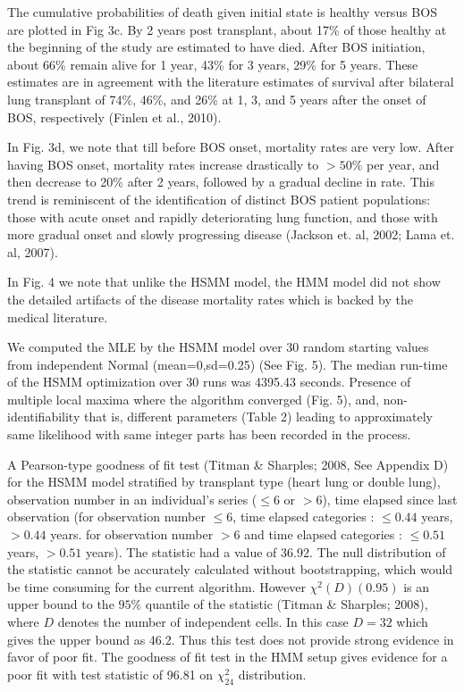 \documentclass{uwstat572}
\begin{document}
The cumulative probabilities of death given initial state is healthy versus BOS are plotted in Fig 3c. By 2 years post transplant, about 17\% of those healthy at the beginning of the study are estimated to have died. After BOS initiation, about 66\% remain alive for 1 year, 43\% for 3 years, 29\% for 5 years. These estimates are in agreement with the literature estimates of survival after bilateral lung transplant of 74\%, 46\%, and 26\% at 1, 3, and 5 years after the onset of BOS, respectively (Finlen et al., 2010).

In Fig. 3d, we note that till before BOS onset, mortality rates are very low. After having BOS onset, mortality rates increase drastically to $>50\%$ per year, and then decrease to 20\% after 2 years, followed by a gradual decline in rate. This trend is reminiscent of the identification of distinct BOS patient populations: those with acute onset and rapidly deteriorating lung function, and those with more gradual onset and slowly progressing disease (Jackson et. al, 2002; Lama et. al, 2007).


In Fig. 4 we note that unlike the HSMM model, the HMM model did not show the detailed artifacts of the disease mortality rates which is backed by the medical literature.

We computed the MLE by the HSMM model over 30 random starting values from independent Normal (mean=0,sd=0.25) (See Fig. 5). The median run-time of the HSMM optimization over 30 runs was 4395.43 seconds. Presence of multiple local maxima where the algorithm converged (Fig. 5), and, non-identifiability that is, different parameters (Table 2) leading to approximately same likelihood with same integer parts has been recorded in the process.



A Pearson-type goodness of fit test (Titman \& Sharples; 2008, See Appendix D) for the HSMM  model stratified by transplant type (heart lung or double lung), observation number in an individual’s series ($\leq 6$ or $>6$), time elapsed since last observation (for observation number $\leq 6$, time elapsed categories : $\leq 0.44$ years, $> 0.44$ years. for observation number $> 6$ and time elapsed categories : $\leq 0.51$ years, $> 0.51$ years). The statistic had a value of 36.92. The null distribution of the statistic cannot be accurately calculated without bootstrapping, which would be time consuming for the current algorithm. However $\chi^2(D) (0.95)$ is an upper bound to the $95\%$ quantile of the statistic (Titman \& Sharples; 2008), where $D$ denotes the number of independent cells. In this case $D = 32$ which gives the upper bound as 46.2. Thus this test does not provide strong evidence in favor of poor fit. The goodness of fit test in the HMM setup gives evidence for a poor fit with test statistic of 96.81 on $\chi^2_{24}$ distribution.
\end{document}
